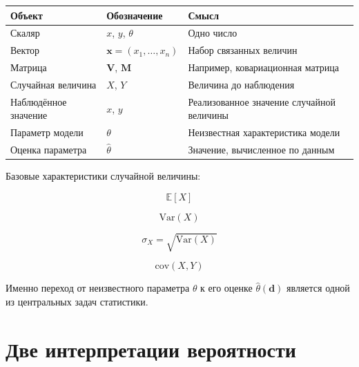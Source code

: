 \documentclass[
  russian,
  12pt,
  a4paper,
  a4paper,
  openany]{scrbook}
\newcounter{none} %
\begin{document}
{\def\LTcaptype{none} %
\begin{longtable}[]{@{}
  >{\raggedright\arraybackslash}p{}
  >{\raggedright\arraybackslash}p{}
  >{\raggedright\arraybackslash}p{}@{}}
\toprule\noalign{}
\begin{minipage}[b]{\linewidth}\raggedright
Объект
\end{minipage} & \begin{minipage}[b]{\linewidth}\raggedright
Обозначение
\end{minipage} & \begin{minipage}[b]{\linewidth}\raggedright
Смысл
\end{minipage} \\
\midrule\noalign{}
\endhead
\bottomrule\noalign{}
\endlastfoot
Скаляр & \(x\), \(y\), \(\theta\) & Одно число \\
Вектор & \(\mathbf x=(x_1,\ldots,x_n)\) & Набор связанных величин \\
Матрица & \(\mathbf V\), \(\mathbf M\) & Например, ковариационная
матрица \\
Случайная величина & \(X\), \(Y\) & Величина до наблюдения \\
Наблюдённое значение & \(x\), \(y\) & Реализованное значение случайной
величины \\
Параметр модели & \(\theta\) & Неизвестная характеристика модели \\
Оценка параметра & \(\widehat{\theta}\) & Значение, вычисленное по
данным \\
\end{longtable}
}

Базовые характеристики случайной величины:

\[\mathbb E[X]\]

\[\mathrm{Var}(X)\]

\[\sigma_X=\sqrt{\mathrm{Var}(X)}\]

\[\mathrm{cov}(X,Y)\]

Именно переход от неизвестного параметра \(\theta\) к его оценке
\(\widehat{\theta}(\mathbf d)\) является одной из центральных задач
статистики.

\section{Две интерпретации
вероятности}\label{ux434ux432ux435-ux438ux43dux442ux435ux440ux43fux440ux435ux442ux430ux446ux438ux438-ux432ux435ux440ux43eux44fux442ux43dux43eux441ux442ux438}
\end{document}

